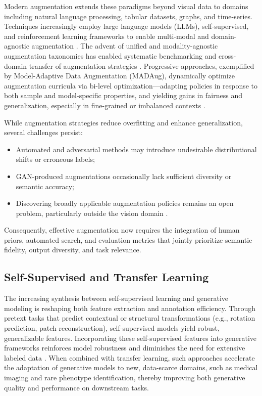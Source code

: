 Modern augmentation extends these paradigms beyond visual data to domains including natural language processing, tabular datasets, graphs, and time-series. Techniques increasingly employ large language models (LLMs), self-supervised, and reinforcement learning frameworks to enable multi-modal and domain-agnostic augmentation \cite{ref1,ref2,ref3,ref5,ref6,ref10,ref12,ref13,ref14,ref15,ref16,ref18,ref21,ref22,ref23,ref24,ref25,ref26,ref29,ref30,ref32,ref60,ref62,ref64,ref65,ref70,ref83}. The advent of unified and modality-agnostic augmentation taxonomies has enabled systematic benchmarking and cross-domain transfer of augmentation strategies \cite{ref60,ref62}. Progressive approaches, exemplified by Model-Adaptive Data Augmentation (MADAug), dynamically optimize augmentation curricula via bi-level optimization---adapting policies in response to both sample and model-specific properties, and yielding gains in fairness and generalization, especially in fine-grained or imbalanced contexts \cite{ref66}.

While augmentation strategies reduce overfitting and enhance generalization, several challenges persist:
\begin{itemize}
    \item Automated and adversarial methods may introduce undesirable distributional shifts or erroneous labels;
    \item GAN-produced augmentations occasionally lack sufficient diversity or semantic accuracy;
    \item Discovering broadly applicable augmentation policies remains an open problem, particularly outside the vision domain \cite{ref62,ref66,ref85}.
\end{itemize}
Consequently, effective augmentation now requires the integration of human priors, automated search, and evaluation metrics that jointly prioritize semantic fidelity, output diversity, and task relevance.

\subsection{Self-Supervised and Transfer Learning}

The increasing synthesis between self-supervised learning and generative modeling is reshaping both feature extraction and annotation efficiency. Through pretext tasks that predict contextual or structural transformations (e.g., rotation prediction, patch reconstruction), self-supervised models yield robust, generalizable features. Incorporating these self-supervised features into generative frameworks reinforces model robustness and diminishes the need for extensive labeled data \cite{ref79}. When combined with transfer learning, such approaches accelerate the adaptation of generative models to new, data-scarce domains, such as medical imaging and rare phenotype identification, thereby improving both generative quality and performance on downstream tasks.

